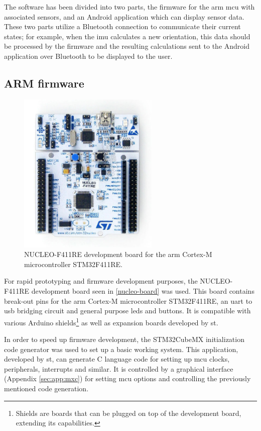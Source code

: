 The software has been divided into two parts, the firmware for the \gls{arm} \gls{mcu} with associated sensors, and an Android application which can display sensor data. These two parts utilize a Bluetooth connection to communicate their current states; for example, when the \gls{imu} calculates a new orientation, this data should be processed by the firmware and the resulting calculations sent to the Android application over Bluetooth to be displayed to the user.

\subsection{ARM firmware}

\begin{figure}[H]
\centering
\includegraphics[width=0.6\textwidth]{Figures/stm32nucleo.jpg}
\caption{NUCLEO-F411RE development board for the \gls{arm} Cortex-M microcontroller STM32F411RE.}
\label{nucleo-board}
\end{figure}

For rapid prototyping and firmware development purposes, the NUCLEO-F411RE development board seen in \autoref{nucleo-board} was used. This board contains break-out pins for the \gls{arm} Cortex-M microcontroller STM32F411RE, an \gls{uart} to \gls{usb} bridging circuit and general purpose \gls{led}s and buttons. It is compatible with various Arduino shields\footnote{Shields are boards that can be plugged on top of the development board, extending its capabilities.} as well as expansion boards developed by \gls{st}.

In order to speed up firmware development, the STM32CubeMX \cite{stm32cubemx} initialization code generator was used to set up a basic working system. This application, developed by \gls{st}, can generate C language code for setting up \gls{mcu} clocks, peripherals, interrupts and similar. It is controlled by a graphical interface (Appendix \ref{sec:app:mxc}) for setting \gls{mcu} options and controlling the previously mentioned code generation.


